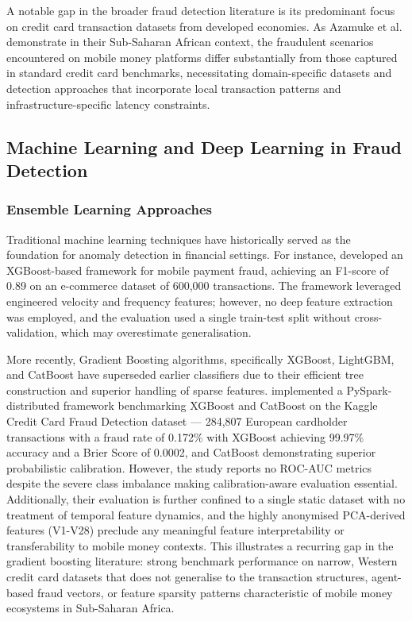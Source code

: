 \documentclass[a4paper,fleqn]{cas-sc}
\begin{document}
A notable gap in the broader fraud detection literature is its predominant focus on credit card transaction datasets from developed economies. As Azamuke et al. \cite{Azamuke2025Financial} demonstrate in their Sub-Saharan African context, the fraudulent scenarios encountered on mobile money platforms differ substantially from those captured in standard credit card benchmarks, necessitating domain-specific datasets and detection approaches that incorporate local transaction patterns and infrastructure-specific latency constraints.

\subsection{Machine Learning and Deep Learning in Fraud Detection}

\subsubsection{Ensemble Learning Approaches}
Traditional machine learning techniques have historically served as the foundation for anomaly detection in financial settings. For instance, \cite{hajek2022fraud} developed an XGBoost-based framework for mobile payment fraud, achieving an F1-score of 0.89 on an e-commerce dataset of 600,000 transactions. The framework leveraged engineered velocity and frequency features; however, no deep feature extraction was employed, and the evaluation used a single train-test split without cross-validation, which may overestimate generalisation.

More recently, Gradient Boosting algorithms, specifically XGBoost, LightGBM, and CatBoost have superseded earlier classifiers due to their efficient tree construction and superior handling of sparse features. \cite{Theodorakopoulos2025BigData} implemented a PySpark-distributed framework benchmarking XGBoost and CatBoost on the Kaggle Credit Card Fraud Detection dataset — 284,807 European cardholder transactions with a fraud rate of 0.172\%  with XGBoost achieving 99.97\% accuracy and a Brier Score of 0.0002, and CatBoost demonstrating superior probabilistic calibration. However, the study reports no ROC-AUC metrics despite the severe class imbalance making calibration-aware evaluation essential. Additionally, their evaluation is further confined to a single static dataset with no treatment of temporal feature dynamics, and the highly anonymised PCA-derived features (V1-V28) preclude any meaningful feature interpretability or transferability to mobile money contexts. This illustrates a recurring gap in the gradient boosting literature: strong benchmark performance on narrow, Western credit card datasets that does not generalise to the transaction structures, agent-based fraud vectors, or feature sparsity patterns characteristic of mobile money ecosystems in Sub-Saharan Africa.
\end{document}
